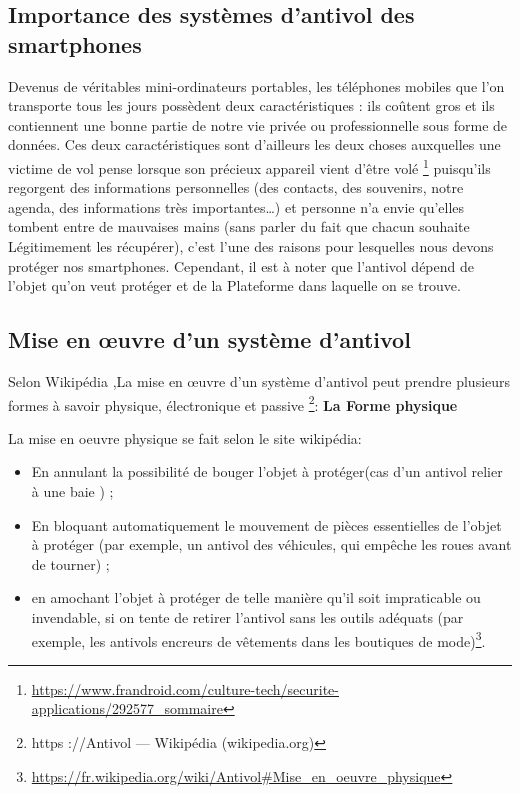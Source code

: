 \documentclass[a4paper, 12pt]{article}
\begin{document}
\subsection{Importance des systèmes d’antivol des smartphones}

\quad Devenus de véritables mini-ordinateurs portables, les téléphones mobiles que l’on transporte tous les jours possèdent deux caractéristiques : ils coûtent gros et ils contiennent une bonne partie de notre vie privée ou professionnelle sous forme de données. Ces deux caractéristiques sont d’ailleurs les deux choses auxquelles une victime de vol pense lorsque son précieux appareil vient d’être volé \footnote{\url{https://www.frandroid.com/culture-tech/securite-applications/292577_sommaire}} puisqu’ils regorgent des informations personnelles (des contacts, des souvenirs, notre agenda, des informations très importantes…) et personne n'a envie qu'elles tombent entre de mauvaises mains (sans parler du fait que chacun souhaite Légitimement les récupérer), c’est l’une des raisons pour lesquelles nous devons protéger nos smartphones. Cependant, il est à noter que l’antivol dépend de l’objet qu’on veut protéger et de la Plateforme dans laquelle on se trouve.

\subsection{Mise en œuvre d’un système d’antivol}

\quad Selon Wikipédia ,La mise en œuvre d'un système d’antivol peut prendre plusieurs formes à savoir physique, électronique et passive
\footnote{https ://Antivol — Wikipédia (wikipedia.org)}:
\newline
\textbf{La Forme physique}

La mise en oeuvre physique se fait selon le site wikipédia:
\begin{itemize}
\item En annulant la possibilité de bouger l'objet à protéger(cas d'un antivol relier à une baie ) ;
\item En bloquant automatiquement le mouvement de pièces essentielles de l'objet à protéger (par exemple, un antivol des véhicules, qui empêche les roues avant de tourner) ;
\item en amochant l'objet à protéger de telle manière qu'il soit impraticable ou invendable, si on tente de retirer l'antivol sans les outils adéquats (par exemple, les antivols encreurs de vêtements dans les boutiques de mode)\footnote{\url{https://fr.wikipedia.org/wiki/Antivol#Mise_en_oeuvre_physique}}.
\end{itemize}
\end{document}
